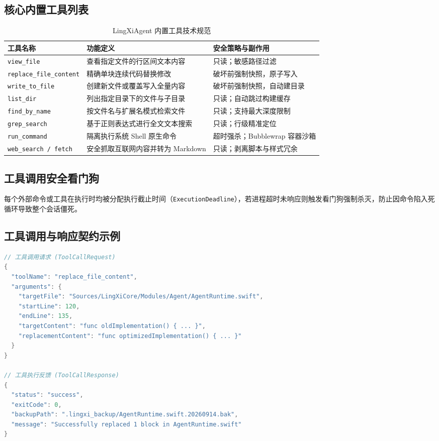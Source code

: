 \documentclass[11pt,a4paper]{article}
\begin{document}
\subsection{核心内置工具列表}
\begin{table}[htbp]
\centering
\small
\begin{tabular}{lp{60mm}p{45mm}}
\toprule
\textbf{工具名称} & \textbf{功能定义} & \textbf{安全策略与副作用} \\
\midrule
\texttt{view\_file} & 查看指定文件的行区间文本内容 & 只读；敏感路径过滤 \\
\texttt{replace\_file\_content} & 精确单块连续代码替换修改 & 破坏前强制快照，原子写入 \\
\texttt{write\_to\_file} & 创建新文件或覆盖写入全量内容 & 破坏前强制快照，自动建目录 \\
\texttt{list\_dir} & 列出指定目录下的文件与子目录 & 只读；自动跳过构建缓存 \\
\texttt{find\_by\_name} & 按文件名与扩展名模式检索文件 & 只读；支持最大深度限制 \\
\texttt{grep\_search} & 基于正则表达式进行全文文本搜索 & 只读；行级精准定位 \\
\texttt{run\_command} & 隔离执行系统 Shell 原生命令 & 超时强杀；Bubblewrap 容器沙箱 \\
\texttt{web\_search / fetch} & 安全抓取互联网内容并转为 Markdown & 只读；剥离脚本与样式冗余 \\
\bottomrule
\end{tabular}
\caption{LingXiAgent 内置工具技术规范}
\end{table}

\subsection{工具调用安全看门狗}
每个外部命令或工具在执行时均被分配执行截止时间（\texttt{ExecutionDeadline}），若进程超时未响应则触发看门狗强制杀灭，防止因命令陷入死循环导致整个会话僵死。

\subsection{工具调用与响应契约示例}
\begin{lstlisting}[language=Java]
// 工具调用请求 (ToolCallRequest)
{
  "toolName": "replace_file_content",
  "arguments": {
    "targetFile": "Sources/LingXiCore/Modules/Agent/AgentRuntime.swift",
    "startLine": 120,
    "endLine": 135,
    "targetContent": "func oldImplementation() { ... }",
    "replacementContent": "func optimizedImplementation() { ... }"
  }
}

// 工具执行反馈 (ToolCallResponse)
{
  "status": "success",
  "exitCode": 0,
  "backupPath": ".lingxi_backup/AgentRuntime.swift.20260914.bak",
  "message": "Successfully replaced 1 block in AgentRuntime.swift"
}
\end{lstlisting}
\end{document}
